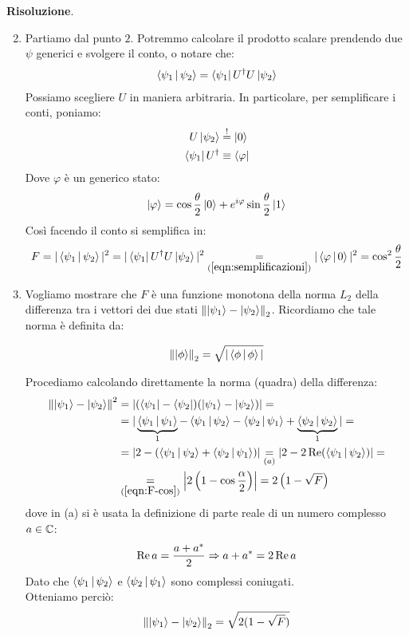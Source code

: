 \documentclass[../../InformazioneQuantistica.tex]{subfiles}
\begin{document}
\textbf{Risoluzione}.
\begin{enumerate}
\setcounter{enumi}{1}
\item Partiamo dal punto $2$. Potremmo calcolare il prodotto scalare prendendo due $\psi$ generici e svolgere il conto, o notare che:
\begin{align*}
\Braket{\psi_1|\psi_2} = \Bra{\psi_1} U^\dag U\Ket{\psi_2}
\end{align*}
Possiamo scegliere $U$ in maniera arbitraria. In particolare, per semplificare i conti, poniamo:
\begin{align}\nonumber
U\Ket{\psi_2} &\overset{!}{=}\Ket{0}\\
\Bra{\psi_1}U^\dag &\equiv \Bra{\varphi}
\label{eqn:semplificazioni}
\end{align}
Dove $\varphi$ è un generico stato:
\begin{align*}
\Ket{\varphi} = \cos\frac{\theta}{2}\Ket{0} + e^{i\varphi}\sin\frac{\theta}{2}\Ket{1}
\end{align*}
Così facendo il conto si semplifica in:
\begin{align}
\label{eqn:F-cos}
F= |\Braket{\psi_1|\psi_2}|^2 = |\Bra{\psi_1}U^\dag U\Ket{\psi_2}|^2 \underset{(\ref{eqn:semplificazioni})}{=}|\Braket{\varphi|0}|^2 = \cos^2 \frac{\theta}{2}
\end{align}
\setcounter{enumi}{0}
\item Vogliamo mostrare che $F$ è una funzione monotona della norma $L_2$ della differenza tra i vettori dei due stati $\left\lVert\Ket{\psi_1}- \Ket{\psi_2}\right\rVert_2$. Ricordiamo che tale norma è definita da:

\begin{align*}
\left\lVert\Ket{\phi}\right\rVert_2  = \sqrt{|\Braket{\phi|\phi}|}
\end{align*}

Procediamo calcolando direttamente la norma (quadra) della differenza:
\begin{align*}
\left\lVert\Ket{\psi_1}-\Ket{\psi_2}\right\rVert^2 &=
|(\Bra{\psi_1}-\Bra{\psi_2})(\Ket{\psi_1}-\Ket{\psi_2})|=\\
&=|\underbrace{\Braket{\psi_1|\psi_1}}_{1} - \Braket{\psi_1|\psi_2} - \Braket{\psi_2|\psi_1} + \underbrace{\Braket{\psi_2|\psi_2}}_{1}| =\\
&= |2-(\Braket{\psi_1|\psi_2}+\Braket{\psi_2|\psi_1})| \underset{(a)}{=} |2-2\operatorname{Re}(\Braket{\psi_1|\psi_2})|=\\
 &\underset{(\ref{eqn:F-cos})}{=}\left |2\left(1-\cos\frac{\alpha}{2}\right)\right| = 2\left(1-\sqrt{F}\right)
\end{align*}
dove in (a) si è usata la definizione di parte reale di un numero complesso $a \in \mathbb{C}$:
\begin{align*}
\operatorname{Re}a = \frac{a+a^*}{2} \Rightarrow a+a^* =2\operatorname{Re}a
\end{align*}
Dato che $\Braket{\psi_1|\psi_2}$ e $\Braket{\psi_2|\psi_1}$ sono complessi coniugati.\\
Otteniamo perciò:
\begin{align*}
    \left\lVert\Ket{\psi_1} - \Ket{\psi_2}\right\rVert_2 = \sqrt{2(1-\sqrt{F})}
\end{align*}

\end{enumerate}
\end{document}
